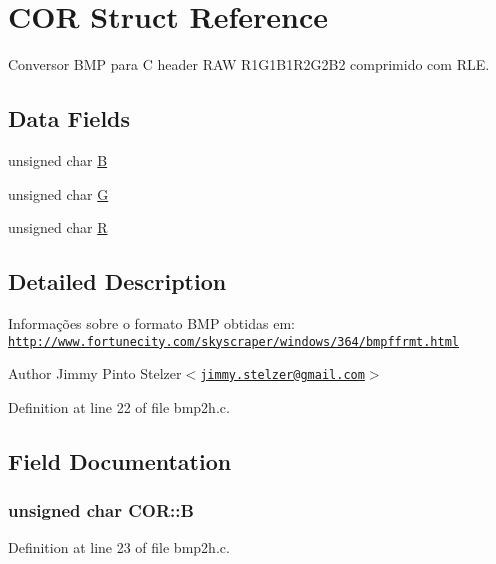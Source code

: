 \hypertarget{structCOR}{
\section{COR Struct Reference}
\label{structCOR}
}


Conversor BMP para C header RAW R1G1B1R2G2B2 comprimido com RLE.  


\subsection*{Data Fields}
\begin{DoxyCompactItemize}
\item 
unsigned char \hyperlink{structCOR_a948d1b997fff2cc3e5696c7aa5232cbd}{B}
\item 
unsigned char \hyperlink{structCOR_ac120339669430e3da80992d85dc3e989}{G}
\item 
unsigned char \hyperlink{structCOR_a14d6d522c67f55b70b63023359363af7}{R}
\end{DoxyCompactItemize}


\subsection{Detailed Description}
Informações sobre o formato BMP obtidas em: \href{http://www.fortunecity.com/skyscraper/windows/364/bmpffrmt.html}{\tt http://www.fortunecity.com/skyscraper/windows/364/bmpffrmt.html}

\begin{DoxyAuthor}{Author}
Jimmy Pinto Stelzer$<$\href{mailto:jimmy.stelzer@gmail.com}{\tt jimmy.stelzer@gmail.com}$>$ 
\end{DoxyAuthor}


Definition at line 22 of file bmp2h.c.



\subsection{Field Documentation}
\hypertarget{structCOR_a948d1b997fff2cc3e5696c7aa5232cbd}{
\subsubsection[{B}]{\setlength{\rightskip}{0pt plus 5cm}unsigned char {\bf COR::B}}}
\label{structCOR_a948d1b997fff2cc3e5696c7aa5232cbd}


Definition at line 23 of file bmp2h.c.

